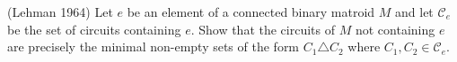 \prob
{
    (Lehman 1964) Let $e$ be an element of a connected binary matroid $M$ and let $\mathcal{C}_e$ be the set of circuits
    containing $e$. Show that the circuits of $M$ not containing $e$ are precisely the minimal non-empty sets of the
    form $C_1 \triangle C_2$ where $C_1, C_2 \in \mathcal{C}_e$.
}